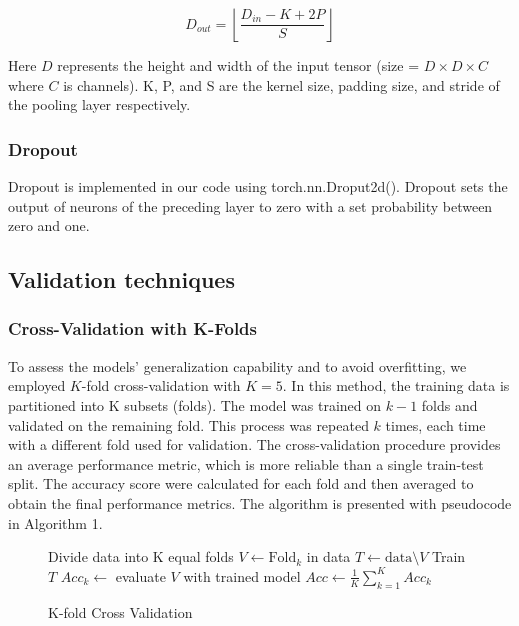 \begin{equation}
    D_{out} = \left\lfloor\frac {D_{in} -K + 2P}{S}\right\rfloor
    \label{eq:pooling-dims}
\end{equation}


Here $D$ represents the height and width of the input tensor (size = $D\times D \times C$ where $C$ is channels). K, P, and S are the kernel size, padding size, and stride of the pooling layer respectively.

\subsubsection{Dropout}
Dropout is implemented in our code using torch.nn.Droput2d(). Dropout sets the output of neurons of the preceding layer to zero with a set probability between zero and one. 


\subsection{Validation techniques}

\subsubsection{Cross-Validation with K-Folds}

To assess the models' generalization capability and to avoid overfitting, we employed $K$-fold cross-validation with $K = 5$. In this method, the training data is partitioned into K subsets (folds). The model was trained on $k-1$ folds and validated on the remaining fold. This process was repeated $k$ times, each time with a different fold used for validation. The cross-validation procedure provides an average performance metric, which is more reliable than a single train-test split. The accuracy score were calculated for each fold and then averaged to obtain the final performance metrics. The algorithm is presented with pseudocode in Algorithm 1.


\begin{figure}[H]
    \begin{algorithm}[H]
    \caption{K-fold Cross Validation \cite{K-foldCrossValidation}}
    \label{algo:kfold}
        \begin{algorithmic}[1]
            \State Divide data into K equal folds 
                \State $V \gets \text{Fold}_{k}$ in data
                \State $T \gets \text{data} \setminus V$
                \State Train $T$
                \State $Acc_k \gets$ evaluate $V$ with trained model
            \EndFor
            \State $Acc \gets \frac{1}{K} \sum_{k=1}^{K} Acc_k$
             \EndProcedure
        \end{algorithmic}
    \end{algorithm}
\end{figure}

